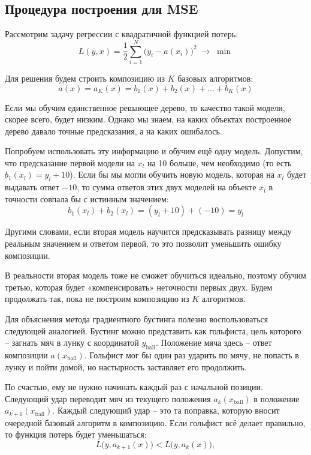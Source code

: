 \subsection{Процедура построения для MSE}

Рассмотрим задачу регрессии с квадратичной функцией потерь:
\[ L(y, x) = \frac{1}{2} \sum_{i=1}^{N} \bigl(y_i - a(x_i)\bigr)^2 \; \to \; \min \]

Для решения будем строить композицию из $K$ базовых алгоритмов:\[ a(x) = a_K(x) = b_1(x) + b_2(x) + \dots + b_K(x) \]

Если мы обучим единственное решающее дерево, то качество такой модели, скорее всего, будет низким.
Однако мы знаем, на каких объектах построенное дерево давало точные предсказания, а на каких ошибалось.

Попробуем использовать эту информацию и обучим ещё одну модель.
Допустим, что предсказание первой модели на $x_l$ на 10 больше, чем необходимо (то есть $b_1(x_l) = y_l + 10$).
Если бы мы могли обучить новую модель, которая на $x_l$ будет выдавать ответ $-10$, то сумма ответов этих двух
моделей на объекте $x_l$ в точности совпала бы с истинным значением:
\[ b_1(x_l) + b_2(x_l) = (y_l + 10) + (-10) = y_l \]

Другими словами, если вторая модель научится предсказывать разницу между реальным значением и ответом первой, то это
позволит уменьшить ошибку композиции.

В реальности вторая модель тоже не сможет обучиться идеально, поэтому обучим третью, которая будет «компенсировать»
неточности первых двух.
Будем продолжать так, пока не построим композицию из $K$ алгоритмов.

Для объяснения метода градиентного бустинга полезно воспользоваться следующей аналогией.
Бустинг можно представить как гольфиста, цель которого -- загнать мяч в лунку с координатой $y_{\text{ball}}$.
Положение мяча здесь -- ответ композиции $a(x_{\text{ball}})$.
Гольфист мог бы один раз ударить по мячу, не попасть в лунку и пойти домой, но настырность заставляет его продолжить.

По счастью, ему не нужно начинать каждый раз с начальной позиции.
Следующий удар переводит мяч из текущего положения $a_k(x_{\text{ball}})$ в положение $a_{k+1}(x_{\text{ball}})$.
Каждый следующий удар -- это та поправка, которую вносит очередной базовый алгоритм в композицию.
Если гольфист всё делает правильно, то функция потерь будет уменьшаться:
\[ L\bigl(y, a_{k+1}(x)\bigr) < L\bigl(y, a_k(x)\bigr),\]

